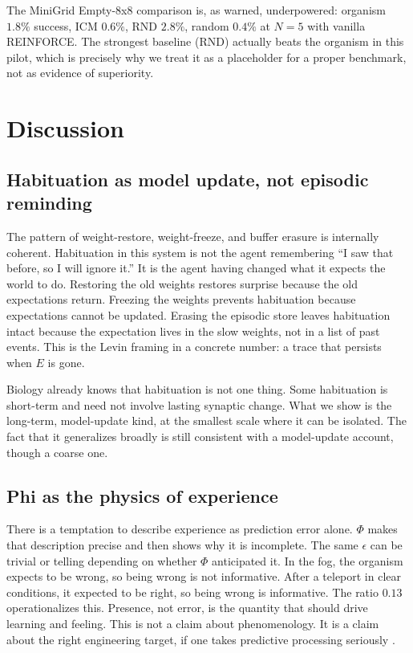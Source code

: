 \documentclass[11pt,a4paper]{article}
\begin{document}
The MiniGrid Empty-8x8 comparison is, as warned, underpowered: organism $1.8\%$ success, ICM $0.6\%$, RND $2.8\%$, random $0.4\%$ at $N=5$ with vanilla REINFORCE. The strongest baseline (RND) actually beats the organism in this pilot, which is precisely why we treat it as a placeholder for a proper benchmark, not as evidence of superiority.

\section{Discussion}
\label{sec:discussion}

\subsection{Habituation as model update, not episodic reminding}

The pattern of weight-restore, weight-freeze, and buffer erasure is internally coherent. Habituation in this system is not the agent remembering ``I saw that before, so I will ignore it.'' It is the agent having changed what it expects the world to do. Restoring the old weights restores surprise because the old expectations return. Freezing the weights prevents habituation because expectations cannot be updated. Erasing the episodic store leaves habituation intact because the expectation lives in the slow weights, not in a list of past events. This is the Levin framing in a concrete number: a trace that persists when $E$ is gone.

Biology already knows that habituation is not one thing. Some habituation is short-term and need not involve lasting synaptic change. What we show is the long-term, model-update kind, at the smallest scale where it can be isolated. The fact that it generalizes broadly is still consistent with a model-update account, though a coarse one.

\subsection{Phi as the physics of experience}

There is a temptation to describe experience as prediction error alone. $\Phi$ makes that description precise and then shows why it is incomplete. The same $\epsilon$ can be trivial or telling depending on whether $\Phi$ anticipated it. In the fog, the organism expects to be wrong, so being wrong is not informative. After a teleport in clear conditions, it expected to be right, so being wrong is informative. The ratio $0.13$ operationalizes this. Presence, not error, is the quantity that should drive learning and feeling. This is not a claim about phenomenology. It is a claim about the right engineering target, if one takes predictive processing seriously \cite{friston2010, laukkonen2025}.
\end{document}
